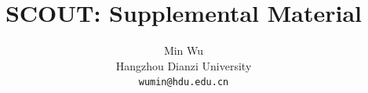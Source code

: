 \documentclass[letterpaper,twocolumn,10pt]{article}
\begin{document}
\title{SCOUT: Supplemental Material}
\author{{\rm Min Wu}\\
Hangzhou Dianzi University\\
\texttt{wumin@hdu.edu.cn}}
\maketitle
\thispagestyle{empty}

\setcounter{section}{0}
\setcounter{subsection}{0}
\setcounter{figure}{0}
\setcounter{table}{0}
\setcounter{equation}{0}

\renewcommand{\thesection}{S\arabic{section}}
\renewcommand{\thesubsection}{S\arabic{section}.\arabic{subsection}}
\renewcommand{\thefigure}{S\arabic{figure}}
\renewcommand{\thetable}{S\arabic{table}}
\renewcommand{\theequation}{S\arabic{equation}}









%

\end{document}
